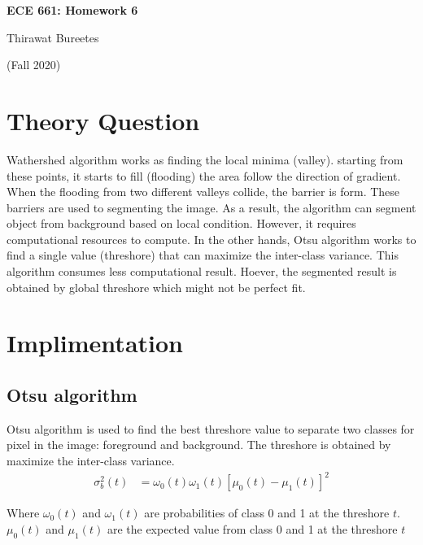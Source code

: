 \documentclass[11pt]{article}
\begin{document}
\begin{center}
\Large{\textbf{ECE 661: Homework 6}}

Thirawat Bureetes

(Fall 2020)
\end{center}
	
 

\section*{Theory Question}

Wathershed algorithm works as finding the local minima (valley). starting from these points, it starts to fill (flooding) the area follow the direction of gradient. When the flooding from two different valleys collide, the barrier is form. These barriers are used to segmenting the image. As a result, the algorithm can segment object from background based on local condition. However, it requires computational resources to compute. In the other hands, Otsu algorithm works to find a single value (threshore) that can maximize the inter-class variance. This algorithm consumes less computational result. Hoever, the segmented result is obtained by global threshore which might not be perfect fit.



\section*{Implimentation}

\subsection*{Otsu algorithm}

Otsu algorithm is used to find the best threshore value to separate two classes for pixel in the image: foreground and background. The threshore is obtained by maximize the inter-class variance. 
\begin{align*}
\sigma^2_b(t) &= \omega_0(t)\omega_1(t)[\mu_0(t)-\mu_1(t)]^2
\end{align*}

Where $\omega_0(t)$ and $\omega_1(t)$ are probabilities of class 0 and 1 at the threshore $t$. $\mu_0(t)$ and $\mu_1(t)$ are the expected value from class 0 and 1 at the threshore $t$
\end{document}
